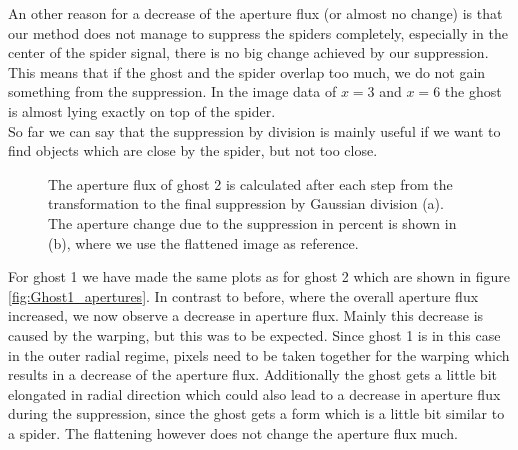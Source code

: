 An other reason for a decrease of the aperture flux (or almost no change) is that our method does not manage to suppress the spiders completely, especially in the center of the spider signal, there is no big change achieved by our suppression. This means that if the ghost and the spider overlap too much, we do not gain something from the suppression. In the image data of $x=3$ and $x=6$ the ghost is almost lying exactly on top of the spider.\\
So far we can say that the suppression by division is mainly useful if we want to find objects which are close by the spider, but not too close. \\
\begin{figure}[H]
	\centering
\caption{The aperture flux of ghost 2 is calculated after each step from the transformation to the final suppression by Gaussian division (a). The aperture change due to the suppression in percent is shown in (b), where we use the flattened image as reference.}
\label{fig:Ghost2_apertures}
\end{figure}
For ghost 1 we have made the same plots as for ghost 2 which are shown in figure \ref{fig:Ghost1_apertures}. In contrast to before, where the overall aperture flux increased, we now observe a decrease in aperture flux. Mainly this decrease is caused by the warping, but this was to be expected. Since ghost 1 is in this case in the outer radial regime, pixels need to be taken together for the warping which results in a decrease of the aperture flux. Additionally the ghost gets a little bit elongated in radial direction which could also lead to a decrease in aperture flux during the suppression, since the ghost gets a form which is a little bit similar to a spider. The flattening however does not change the aperture flux much.\\
